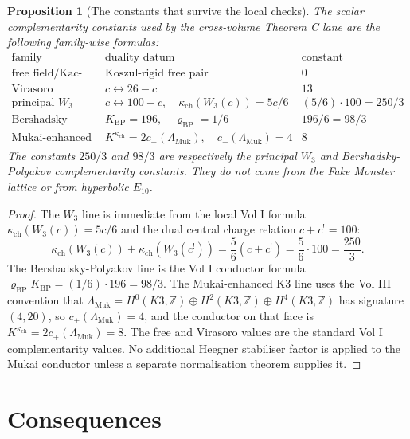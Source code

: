 \documentclass[11pt]{amsart}
\newtheorem{prop}[thm]{Proposition}
\theoremstyle{definition}
\newcommand{\kch}{\kappa_{\mathrm{ch}}}
\newcommand{\Muk}{\Lambda_{\mathrm{Muk}}}
\newcommand{\KKconf}{K^{\kch}}
\begin{document}
\begin{prop}[The constants that survive the local checks]
\label{prop:constants-survive}
The scalar complementarity constants used by the cross-volume
Theorem C lane are the following family-wise formulas:
\[
\begin{array}{c|c|c}
\text{family} & \text{duality datum} & \text{constant}\\
\hline
\text{free field/Kac-Moody} & \text{Koszul-rigid free pair} & 0\\
\text{Virasoro} & c\leftrightarrow 26-c & 13\\
\text{principal }W_3 & c\leftrightarrow 100-c,\quad \kch(W_3(c))=5c/6
  & (5/6)\cdot 100=250/3\\
\text{Bershadsky-Polyakov} & K_{\mathrm{BP}}=196,\quad \varrho_{\mathrm{BP}}=1/6
  & 196/6=98/3\\
\text{Mukai-enhanced K3} & \KKconf=2c_+(\Muk),\quad c_+(\Muk)=4
  & 8
\end{array}
\]
The constants $250/3$ and $98/3$ are respectively the principal $W_3$
and Bershadsky-Polyakov complementarity constants.  They do not come
from the Fake Monster lattice or from hyperbolic $E_{10}$.
\end{prop}

\begin{proof}
The $W_3$ line is immediate from the local Vol I formula
$\kch(W_3(c))=5c/6$ and the dual central charge relation
$c+c^!=100$:
\[
  \kch(W_3(c))+\kch(W_3(c^!))
  =
  \frac{5}{6}(c+c^!)
  =
  \frac{5}{6}\cdot 100
  =
  \frac{250}{3}.
\]
The Bershadsky-Polyakov line is the Vol I conductor formula
$\varrho_{\mathrm{BP}}K_{\mathrm{BP}}=(1/6)\cdot 196=98/3$.
The Mukai-enhanced K3 line uses the Vol III convention that
$\Muk=H^0(K3,\mathbb Z)\oplus H^2(K3,\mathbb Z)\oplus H^4(K3,\mathbb Z)$
has signature $(4,20)$, so $c_+(\Muk)=4$, and the conductor on that
face is $\KKconf=2c_+(\Muk)=8$.  The free and Virasoro values are the
standard Vol I complementarity values.  No additional Heegner
stabiliser factor is applied to the Mukai conductor unless a separate
normalisation theorem supplies it.
\end{proof}

\section{Consequences}
\label{sec:consequences}
\end{document}
